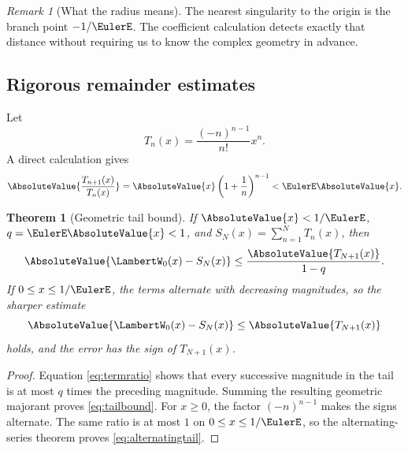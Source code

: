 \documentclass[11pt]{article}
\newtheorem{theorem}{Theorem}[section]
\theoremstyle{remark}
\newtheorem{remark}[remark]{Remark}
\newcommand{\Wz}{\LambertW_{0}}
\begin{document}
\begin{remark}[What the radius means]
The nearest singularity to the origin is the branch point \(-1/\EulerE\).
The coefficient calculation detects exactly that distance without requiring
us to know the complex geometry in advance.
\end{remark}

\subsection{Rigorous remainder estimates}

Let
\[
 T_n(x)=\frac{(-n)^{n-1}}{n!}x^n.
\]
A direct calculation gives
\begin{equation}\label{eq:termratio}
 \AbsoluteValue{\frac{T_{n+1}(x)}{T_n(x)}}
 =\AbsoluteValue{x}\left(1+\frac1n\right)^{n-1}
 <\EulerE\AbsoluteValue{x}.
\end{equation}

\begin{theorem}[Geometric tail bound]\label{thm:taylortail}
If \(\AbsoluteValue{x}<1/\EulerE\), \(q=\EulerE\AbsoluteValue{x}<1\), and
\(S_N(x)=\sum_{n=1}^NT_n(x)\), then
\begin{equation}\label{eq:tailbound}
 \AbsoluteValue{\Wz(x)-S_N(x)}
 \leq\frac{\AbsoluteValue{T_{N+1}(x)}}{1-q}.
\end{equation}
If \(0\leq x\leq1/\EulerE\), the terms alternate with decreasing magnitudes, so
the sharper estimate
\begin{equation}\label{eq:alternatingtail}
 \AbsoluteValue{\Wz(x)-S_N(x)}\leq\AbsoluteValue{T_{N+1}(x)}
\end{equation}
holds, and the error has the sign of \(T_{N+1}(x)\).
\end{theorem}

\begin{proof}
Equation \eqref{eq:termratio} shows that every successive magnitude in the
tail is at most \(q\) times the preceding magnitude.  Summing the resulting
geometric majorant proves \eqref{eq:tailbound}.  For \(x\geq0\), the factor
\((-n)^{n-1}\) makes the signs alternate.  The same ratio is at most \(1\)
on \(0\leq x\leq1/\EulerE\), so the alternating-series theorem proves
\eqref{eq:alternatingtail}.
\end{proof}
\end{document}
